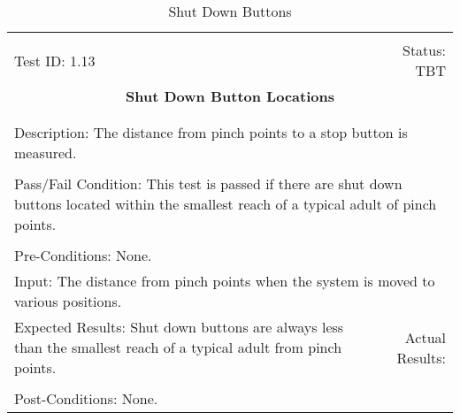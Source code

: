 \documentclass[titlepage]{article}
\begin{document}
\begin{center}%
\begin{table}
\begin{tabular}{|l r|}\hline&\\[-2mm]
	Test ID: 1.13	&Status: TBT\\[-3mm]
	\multicolumn{2}{|c|}{\textbf{\large{Shut Down Button Locations}}}\\&\\\hline&\\[-3mm]
	\multicolumn{2}{|p{\textwidth}|}{Description: The distance from pinch points to a stop button is measured.}\\[1mm]\hline&\\[-3mm]
	\multicolumn{2}{|p{\textwidth}|}{Pass/Fail Condition: This test is passed if there are shut down buttons located within the smallest reach of a typical adult of pinch points.}\\[1mm]\hline&\\[-3mm]
	\multicolumn{2}{|p{\textwidth}|}{Pre-Conditions: None.}\\[4mm]
	\multicolumn{2}{|p{\textwidth}|}{Input: The distance from pinch points when the system is moved to various positions.}\\[2mm]\hline
	\multicolumn{1}{|p{0.49\textwidth}}{Expected Results: Shut down buttons are always less than the smallest reach of a typical adult from pinch points.}	&\multicolumn{1}{|p{0.45\textwidth}|}{Actual Results:}\\\hline&\\[-3mm]
	\multicolumn{2}{|p{\textwidth}|}{Post-Conditions: None.}\\\hline
\end{tabular}
\caption{Shut Down Buttons}
\end{table}
\end{center}
\end{document}
